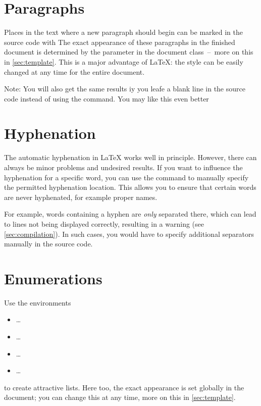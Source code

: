 \section{Paragraphs}
Places in the text where a new paragraph should begin can be marked in the 
source code with  The exact appearance of these paragraphs in the 
finished document is determined by the parameter  in the document 
class~--~more on this in \cref{sec:template}. This is a major advantage of  
\LaTeX{}: the style can be easily changed at any time for the entire document.

Note: You will also get the same results iy you leafe a blank line in the 
source code instead of using the  command. You may like this even 
better

\section{Hyphenation}
\label{sec:hyphenation}
The automatic hyphenation in  \LaTeX{} works well in principle. However, there 
can always be minor problems and undesired results. If you want to influence 
the hyphenation for a specific word, you can use the   
command to manually specify the permitted hyphenation location. This allows you 
to ensure that certain words are never hyphenated, for example proper names.

For example, words containing a hyphen are \emph{only} separated there, which 
can lead to lines not being displayed correctly, resulting in a warning (see  
\cref{sec:compilation}). In such cases, you would have to specify additional 
separators manually in the source code.

\section{Enumerations}
Use the environments
%
\begin{itemize}
 \item {} \ldots {}
 \item {} \ldots {}
 \item {} \ldots {}
 \item {} \ldots {}
\end{itemize}
%
to create attractive lists. Here too, the exact appearance is set globally in 
the document; you can change this at any time, more on this in  
\cref{sec:template}.

